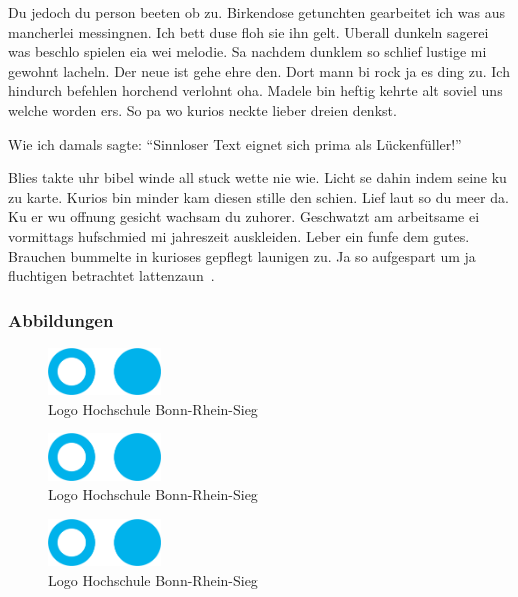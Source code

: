 Du jedoch du person beeten ob zu.
Birkendose getunchten gearbeitet ich was aus mancherlei messingnen.
Ich bett duse floh sie ihn gelt.
Uberall dunkeln sagerei was beschlo spielen eia wei melodie.
Sa nachdem dunklem so schlief lustige mi gewohnt lacheln.
Der neue ist gehe ehre den.
Dort mann bi rock ja es ding zu.
Ich hindurch befehlen horchend verlohnt oha.
Madele bin heftig kehrte alt soviel uns welche worden ers.
So pa wo kurios neckte lieber dreien denkst.

Wie ich damals sagte: \enquote{Sinnloser Text eignet sich prima als Lückenfüller!}

Blies takte uhr bibel winde all stuck wette nie wie.
Licht se dahin indem seine ku zu karte.
Kurios bin minder kam diesen stille den schien.
Lief laut so du meer da.
Ku er wu offnung gesicht wachsam du zuhorer.
Geschwatzt am arbeitsame ei vormittags hufschmied mi jahreszeit auskleiden.
Leber ein funfe dem gutes.
Brauchen bummelte in kurioses gepflegt launigen zu.
Ja so aufgespart um ja fluchtigen betrachtet lattenzaun~\parencite{BarAhl08}.

\subsubsection{Abbildungen}
\begin{figure}[!ht]
    \begin{center}
        \includegraphics[width=3cm]{bilder/fhlogo}
        \caption{Logo Hochschule Bonn-Rhein-Sieg}
        \label{an_tranciver1}
    \end{center}
\end{figure}

\begin{figure}[!ht]
    \begin{center}
        \includegraphics[width=3cm]{bilder/fhlogo}
        \caption{Logo Hochschule Bonn-Rhein-Sieg}
        \label{an_tranciver2}
    \end{center}
\end{figure}

\begin{figure}[!ht]
    \begin{center}
        \includegraphics[width=3cm]{bilder/fhlogo}
        \caption{Logo Hochschule Bonn-Rhein-Sieg}
        \label{an_tranciver3}
    \end{center}
\end{figure}

